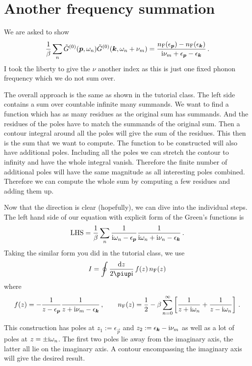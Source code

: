 \documentclass[11pt, english, fleqn, DIV=15, headinclude, BCOR=1cm]{scrartcl}
\begin{document}
\section{Another frequency summation}
\label{homework:2}

We are asked to show
\[
    \frac 1\beta \sum_{n}
    \tilde G^{(0)} (\vec p, \omega_n)
    \tilde G^{(0)} (\vec k, \omega_n + \nu_m)
    = \frac{n_\text F(\epsilon_{\vec p}) - n_\text F(\epsilon_{\vec k})}
        {\iup \nu_m + \epsilon_{\vec p} - \epsilon_{\vec k}} \,.
\]
I took the liberty to give the $\nu$ another index as this is just one fixed
phonon frequency which we do not sum over.

The overall approach is the same as shown in the tutorial class. The left side
contains a sum over countable infinite many summands. We want to find a
function which has as many residues as the original sum has summands. And the
residues of the poles have to match the summands of the original sum. Then a
contour integral around all the poles will give the sum of the residues. This
then is the sum that we want to compute. The function to be constructed will
also have additional poles. Including all the poles we can stretch the contour
to infinity and have the whole integral vanish. Therefore the finite number of
additional poles will have the same magnitude as all interesting poles
combined. Therefore we can compute the whole sum by computing a few residues
and adding them up.

Now that the direction is clear (hopefully), we can dive into the individual
steps. The left hand side of our equation with explicit form of the Green's
functions is
\[
    \text{LHS} = \frac{1}{\beta} \sum_n \frac{1}{\iup \omega_n - \epsilon_{\vec
    p}} \frac{1}{\iup \omega_n + \iup \nu_n - \epsilon_{\vec k}} \,.
\]
Taking the similar form you did in the tutorial class, we use
\[
    I = \oint \frac{\dif z}{2\piup \iup} \, f(z) \, n_\text F(z)
\]
where
\[
    f(z) = - \frac{1}{z - \epsilon_{\vec p}} \frac{1}{z + \iup \nu_m - \epsilon_{\vec k}}
    \eqnsep
    n_\text F(z) = \frac 12 - \beta \sum_{n = 0}^\infty \sbr{
        \frac1{z + \iup \omega_n}
        +
        \frac1{z - \iup \omega_n}
    } \,.
\]

This construction has poles at $z_1 := \epsilon_{\vec p}$ and $z_2 :=
\epsilon_{\vec k} - \iup \nu_m$ as well as a lot of poles at $z = \pm \mathrm i
\omega_n$. The first two poles lie away from the imaginary axis, the latter all
lie on the imaginary axis. A contour encompassing the imaginary axis will give
the desired result.
\end{document}
